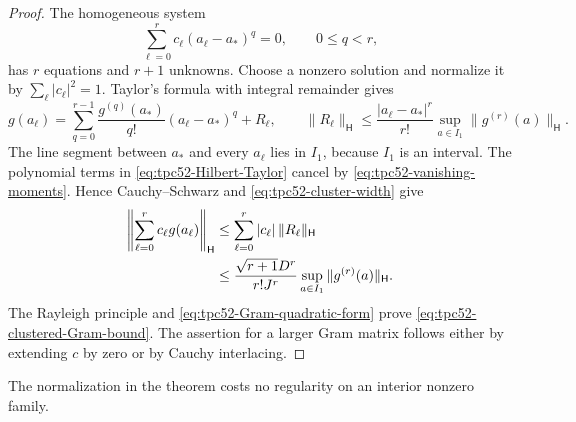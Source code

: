 \begin{proof}
The homogeneous system
\begin{equation}
 \sum_{\ell=0}^r c_\ell(a_\ell-a_*)^q=0,
 \qquad 0\leq q<r,
 \label{eq:tpc52-vanishing-moments}
\end{equation}
has \(r\) equations and \(r+1\) unknowns.  Choose a nonzero solution
and normalize it by \(\sum_\ell|c_\ell|^2=1\).  Taylor's formula with
integral remainder gives
\begin{equation}
 g(a_\ell)
 =\sum_{q=0}^{r-1}
   \frac{g^{(q)}(a_*)}{q!}(a_\ell-a_*)^q+R_\ell,
 \qquad
 \|R_\ell\|_{\mathsf H}
 \leq \frac{|a_\ell-a_*|^r}{r!}
       \sup_{a\in I_1}\|g^{(r)}(a)\|_{\mathsf H}.
 \label{eq:tpc52-Hilbert-Taylor}
\end{equation}
The line segment between \(a_*\) and every \(a_\ell\) lies in
\(I_1\), because \(I_1\) is an interval.  The polynomial terms in
\eqref{eq:tpc52-Hilbert-Taylor} cancel by
\eqref{eq:tpc52-vanishing-moments}.  Hence Cauchy--Schwarz and
\eqref{eq:tpc52-cluster-width} give
\begin{align}
 \left\|\sum_{\ell=0}^r c_\ell g(a_\ell)\right\|_{\mathsf H}
 &\leq \sum_{\ell=0}^r|c_\ell|\,\|R_\ell\|_{\mathsf H}\notag\\
 &\leq \frac{\sqrt{r+1}D^r}{r!J^r}
       \sup_{a\in I_1}\|g^{(r)}(a)\|_{\mathsf H}.
 \label{eq:tpc52-cluster-combination}
\end{align}
The Rayleigh principle and \eqref{eq:tpc52-Gram-quadratic-form} prove
\eqref{eq:tpc52-clustered-Gram-bound}.  The assertion for a larger
Gram matrix follows either by extending \(c\) by zero or by Cauchy
interlacing.
\end{proof}

The normalization in the theorem costs no regularity on an interior
nonzero family.

